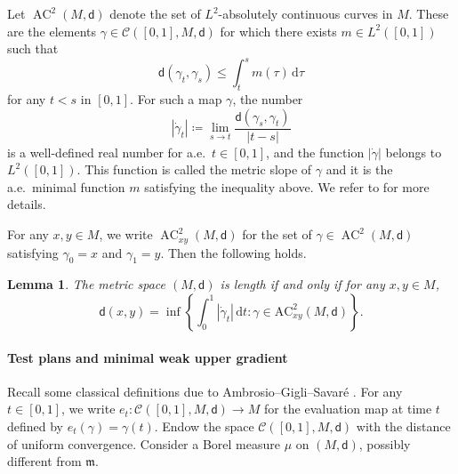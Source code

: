 \documentclass[10pt]{article}
\newcommand{\cC}{\mathcal{C}}
\newcommand{\m}{\mathfrak{m}}
\renewcommand{\d}{\,\mathrm{d}}
\newcommand{\dist}{\mathsf{d}}
\newcommand{\df}{\coloneqq}
\DeclareMathOperator{\AC}{AC}
\theoremstyle{plain}
\newtheorem{lemma}[theorem]{Lemma}
\theoremstyle{definition}
\newcommand{\contpath}{\cC([0,1],M,\dist)}
\newcommand{\accurves}{\AC^2(M,\dist)}
\newcommand{\accurvesxy}{\AC^2_{xy}(M,\dist)}
\begin{document}
Let $\accurves$ denote the set of $L^2$-absolutely continuous curves in $M$. These are the elements $\gamma \in \contpath$ for which there exists $m \in L^2([0,1])$ such that
\begin{equation*}  
\dist(\gamma_t,\gamma_s) \le \int_t^s m(\tau) \d \tau
\end{equation*}
for any $t<s$ in $[0,1]$.
For such a map $\gamma$, the number
\[
|\dot{\gamma}_t| \df \lim_{s \to t} \frac{\dist(\gamma_s,\gamma_t)}{|t-s|}
\]
is a well-defined real number for a.e.~$t \in [0,1]$, and the function $|\dot{\gamma}|$  belongs to $L^2([0,1])$. This function is called the metric slope of $\gamma$ and it is the a.e.~minimal function $m$ satisfying the inequality above. We refer to \cite[Theorem 1.1.2]{AGS-book} for more details.

For any $x, y \in M$, we write $\accurvesxy$ for the set of $\gamma \in \accurves$ satisfying $\gamma_0=x$ and $\gamma_1=y$. Then the following holds.

\begin{lemma}
    The metric space $(M,\dist)$ is length if and only if for any $x,y \in M$,
\[
\dist(x,y) = \inf \left\{\int_0^1 |\dot{\gamma}_t| \d t : \gamma \in \mathrm{AC}_{xy}^2(M,\dist)\right\}.
\]
\end{lemma}

\paragraph{Test plans and  minimal weak upper gradient} Recall some classical definitions due to Ambrosio--Gigli--Savaré \cite[Section 5.1]{AGSInv}. For any $t \in [0,1]$, we write $e_t : \mathcal{C}([0,1],M,\dist) \to M$ for the evaluation map at time $t$ defined by $e_t(\gamma)=\gamma(t)$. Endow the space $\mathcal{C}([0,1],M,\dist)$ with the distance of uniform convergence. Consider a Borel measure  $\mu$ on $(M,\dist)$, possibly different from $\m$. 
\end{document}
